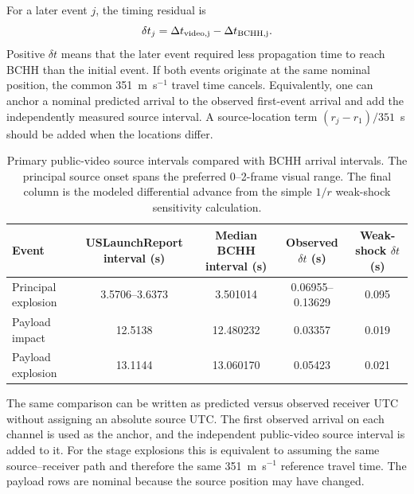\documentclass[]{seismica}
\begin{document}
For a later event $j$, the timing residual is
\begin{equation}
 \delta t_j=\Delta t_{\rm video,j}-\Delta t_{\rm BCHH,j}.
\end{equation}
Positive $\delta t$ means that the later event required less propagation time
to reach BCHH than the initial event. If both events originate at the same
nominal position, the common 351~m~s$^{-1}$ travel time cancels. Equivalently,
one can anchor a nominal predicted arrival to the observed first-event arrival
and add the independently measured source interval. A source-location term
$(r_j-r_1)/351$~s should be added when the locations differ.

\begin{table}[!tbp]
\centering
\caption{Primary public-video source intervals compared with BCHH arrival
intervals. The principal source onset spans the preferred 0--2-frame visual
range. The final column is the modeled differential advance from the simple
$1/r$ weak-shock sensitivity calculation.}
\label{tab:supp_timing_comparison}
\begin{tabularx}{\textwidth}{Xcccc}
\hline
Event & USLaunchReport interval (s) & Median BCHH interval (s) & Observed $\delta t$ (s) & Weak-shock $\delta t$ (s) \\
\hline
Principal explosion & 3.5706--3.6373 & 3.501014 & 0.06955--0.13629 & 0.095 \\
Payload impact & 12.5138 & 12.480232 & 0.03357 & 0.019 \\
Payload explosion & 13.1144 & 13.060170 & 0.05423 & 0.021 \\
\hline
\end{tabularx}
\end{table}

The same comparison can be written as predicted versus observed receiver UTC
without assigning an absolute source UTC. The first observed arrival on each
channel is used as the anchor, and the independent public-video source interval
is added to it. For the stage explosions this is equivalent to assuming the
same source--receiver path and therefore the same 351~m~s$^{-1}$ reference
travel time. The payload rows are nominal because the source position may have
changed.
\end{document}

